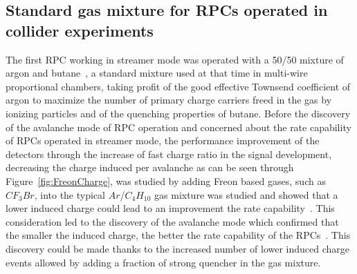 	\subsection{Standard gas mixture for RPCs operated in collider experiments}
	\label{chat4:ssec:gasmix}
	
	The first RPC working in streamer mode was operated with a 50/50 mixture of argon and butane~\cite{SANTONICO81}, a standard mixture used at that time in multi-wire proportional chambers, taking profit of the good effective Townsend coefficient of argon to maximize the number of primary charge carriers freed in the gas by ionizing particles and of the quenching properties of butane. Before the discovery of the avalanche mode of RPC operation and concerned about the rate capability of RPCs operated in streamer mode, the performance improvement of the detectors through the increase of fast charge ratio in the signal development, decreasing the charge induced per avalanche as can be seen through Figure~\ref{fig:FreonCharge}, was studied by adding Freon based gases, such as $CF_3Br$, into the typical $Ar$/$C_4H_{10}$ gas mixture was studied and showed that a lower induced charge could lead to an improvement the rate capability~\cite{CARDARELLI93}. This consideration led to the discovery of the avalanche mode which confirmed that the smaller the induced charge, the better the rate capability of the RPCs~\cite{CROTTY93}. This discovery could be made thanks to the increased number of lower induced charge events allowed by adding a fraction of strong quencher in the gas mixture.
	
